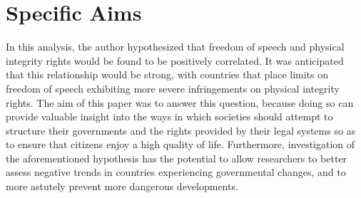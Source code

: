 \documentclass{article}
\begin{document}
\section{Specific Aims}
In this analysis, the author hypothesized that freedom of speech and physical integrity rights would be found to be positively correlated. It was anticipated that this relationship would be strong, with countries that place limits on freedom of speech exhibiting more severe infringements on physical integrity rights. The aim of this paper was to answer this question, because doing so can provide valuable insight into the ways in which societies should attempt to structure their governments and the rights provided by their legal systems so as to ensure that citizens enjoy a high quality of life. Furthermore, investigation of the aforementioned hypothesis has the potential to allow researchers to better assess negative trends in countries experiencing governmental changes, and to more astutely prevent more dangerous developments.
\end{document}
